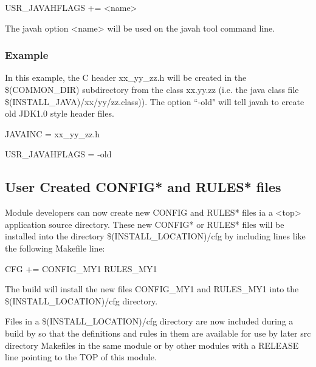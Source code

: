 \begin{description}\item {}USR\_JAVAHFLAGS += \textless{}name\textgreater{}

\end{description}    The javah option \textless{}name\textgreater{} will be used on the javah tool command line.

\subsubsection{Example}

In this example, the C header xx\_yy\_zz.h will be created in the \$(COMMON\_DIR) subdirectory from the class xx.yy.zz 
(i.e. the java class file \$(INSTALL\_JAVA)/xx/yy/zz.class)). The option ``-old" will tell javah to create old JDK1.0 style 
header files.

\begin{description}\item JAVAINC = xx\_yy\_zz.h

\item USR\_JAVAHFLAGS = -old

\end{description}\subsection{User Created CONFIG* and RULES* files}

Module developers can now create new CONFIG and RULES* files ia a \textless{}top\textgreater{} application source directory. These new 
CONFIG* or RULES* files will be installed into the directory \$(INSTALL\_LOCATION)/cfg by including lines like the 
following Makefile line:

\begin{description}\item       {}CFG += CONFIG\_MY1 RULES\_MY1

\end{description}The build will install the new files CONFIG\_MY1 and RULES\_MY1 into the \$(INSTALL\_LOCATION)/cfg directory.

Files in a \$(INSTALL\_LOCATION)/cfg directory are now included during a build by so that the definitions and rules in 
them are available for use by later src directory Makefiles in the same module or by other modules with a RELEASE line 
pointing to the TOP of this module.

